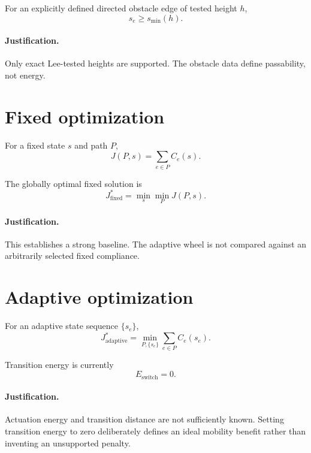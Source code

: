 \documentclass[11pt]{article}
\begin{document}
For an explicitly defined directed obstacle edge of tested height $h$,
\begin{equation}
s_e\ge s_{\min}(h).
\end{equation}

\paragraph{Justification.}
Only exact Lee-tested heights are supported. The obstacle data define passability, not energy.

\section{Fixed optimization}

For a fixed state $s$ and path $P$,
\begin{equation}
J(P,s)
=
\sum_{e\in P}C_e(s).
\end{equation}

The globally optimal fixed solution is
\begin{equation}
J_{\mathrm{fixed}}^*
=
\min_s
\min_P
J(P,s).
\end{equation}

\paragraph{Justification.}
This establishes a strong baseline. The adaptive wheel is not compared against an arbitrarily selected fixed compliance.

\section{Adaptive optimization}

For an adaptive state sequence $\{s_e\}$,
\begin{equation}
J_{\mathrm{adaptive}}^*
=
\min_{P,\{s_e\}}
\sum_{e\in P}
C_e(s_e).
\end{equation}

Transition energy is currently
\begin{equation}
E_{\mathrm{switch}}=0.
\end{equation}

\paragraph{Justification.}
Actuation energy and transition distance are not sufficiently known. Setting transition energy to zero deliberately defines an ideal mobility benefit rather than inventing an unsupported penalty.
\end{document}
